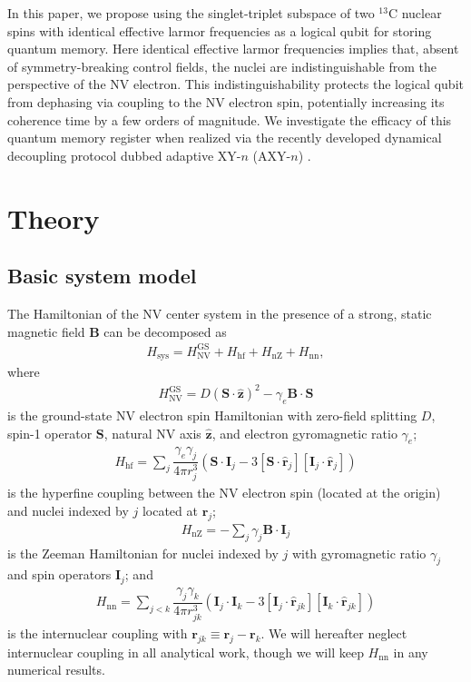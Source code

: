 \documentclass[twocolumn]{revtex4}
\renewcommand{\t}{\text} %
\newcommand{\f}[2]{\dfrac{#1}{#2}} %
\newcommand{\p}[1]{\left(#1\right)} %
\renewcommand{\sp}[1]{\left[#1\right]} %
\renewcommand{\v}{\bm} %
\newcommand{\uv}[1]{\hat{\v{#1}}} %
\renewcommand{\c}{\cdot} %
\begin{document}
In this paper, we propose using the singlet-triplet subspace of two
$^{13}$C nuclear spins with identical effective larmor frequencies as
a logical qubit for storing quantum memory. Here identical effective
larmor frequencies implies that, absent of symmetry-breaking control
fields, the nuclei are indistinguishable from the perspective of the
NV electron. This indistinguishability protects the logical qubit from
dephasing via coupling to the NV electron spin, potentially increasing
its coherence time by a few orders of magnitude. %
We investigate the efficacy of this quantum memory register when
realized via the recently developed dynamical decoupling protocol
dubbed adaptive XY-$n$ (AXY-$n$) \cite{casanova2015robust}.

\section{Theory}

\subsection{Basic system model}

The Hamiltonian of the NV center system in the presence of a strong,
static magnetic field $\v B$ can be decomposed as
\begin{align}
  H_\t{sys} = H_\t{NV}^\t{GS} + H_\t{hf} + H_\t{nZ}  + H_\t{nn},
\end{align}
where
\begin{align}
  H_\t{NV}^\t{GS} = D\p{\v S\c\uv z}^2 - \gamma_e\v B\c\v S
\end{align}
is the ground-state NV electron spin Hamiltonian with zero-field
splitting $D$, spin-1 operator $\v S$, natural NV axis $\uv z$, and
electron gyromagnetic ratio $\gamma_e$;
\begin{align}
  H_\t{hf} = \sum_j\f{\gamma_e\gamma_j}{4\pi r_j^3}
  \p{\v S\c\v I_j-3\sp{\v S\c\uv r_j}\sp{\v I_j\c\uv r_j}}
\end{align}
is the hyperfine coupling between the NV electron spin (located at the
origin) and nuclei indexed by $j$ located at $\v r_j$;
\begin{align}
  H_\t{nZ} = -\sum_j\gamma_j\v B\c\v I_j
\end{align}
is the Zeeman Hamiltonian for nuclei indexed by $j$ with gyromagnetic
ratio $\gamma_j$ and spin operators $\v I_j$; and
\begin{align}
  H_\t{nn} = \sum_{j<k}\f{\gamma_j\gamma_k}{4\pi r_{jk}^3}
  \p{\v I_j\c\v I_k-3\sp{\v I_j\c\uv r_{jk}}\sp{\v I_k\c\uv r_{jk}}}
\end{align}
is the internuclear coupling with $\v r_{jk}\equiv\v r_j-\v r_k$. We
will hereafter neglect internuclear coupling in all analytical work,
though we will keep $H_\t{nn}$ in any numerical results.
\end{document}
